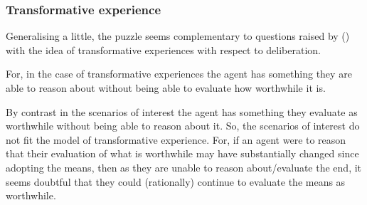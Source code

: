 \documentclass[10pt]{article}
\newcommand{\hozline}[0]{%
  \noindent\hdashrule[0.5ex][c]{\textwidth}{.1pt}{}
}
\begin{document}

\newpage

\hozline

\subsubsection*{Transformative experience}
\label{sec:transf-exper}

Generalising a little, the puzzle seems complementary to questions raised by \citeauthor{Paul:2014aa} (\citeyear{Paul:2014aa}) with the idea of transformative experiences with respect to deliberation.

For, in the case of transformative experiences the agent has something they are able to reason about without being able to evaluate how worthwhile it is.

By contrast in the scenarios of interest the agent has something they evaluate as worthwhile without being able to reason about it.
So, the scenarios of interest do not fit the model of transformative experience.
For, if an agent were to reason that their evaluation of what is worthwhile may have substantially changed since adopting the means, then as they are unable to reason about/evaluate the end, it seems doubtful that they could (rationally) continue to evaluate the means as worthwhile.


\end{document}
